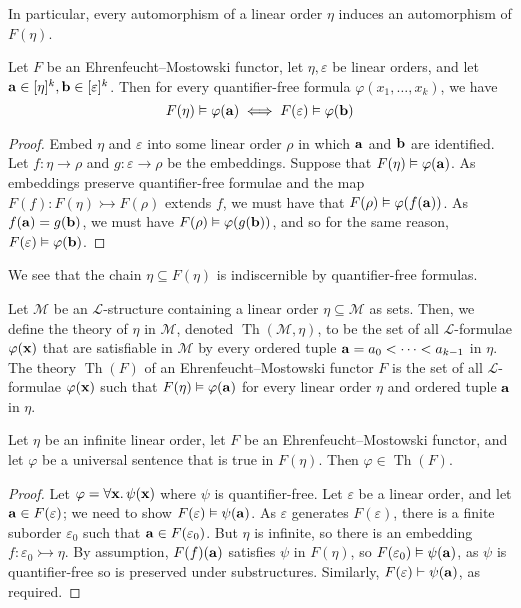In particular, every automorphism of a linear order \( \eta \) induces an automorphism of \( F(\eta) \).
\begin{proposition}
	Let \( F \) be an Ehrenfeucht--Mostowski functor, let \( \eta, \varepsilon \) be linear orders, and let \( \vb a \in [\eta]^k, \vb b \in [\varepsilon]^k \).
	Then for every quantifier-free formula \( \varphi(x_1, \dots, x_k) \), we have
	\[ F(\eta) \vDash \varphi(\vb a) \iff F(\varepsilon) \vDash \varphi(\vb b) \]
\end{proposition}
\begin{proof}
	Embed \( \eta \) and \( \varepsilon \) into some linear order \( \rho \) in which \( \vb a \) and \( \vb b \) are identified.
	Let \( f : \eta \to \rho \) and \( g : \varepsilon \to \rho \) be the embeddings.
	Suppose that \( F(\eta) \vDash \varphi(\vb a) \).
	As embeddings preserve quantifier-free formulae and the map \( F(f) : F(\eta) \rightarrowtail F(\rho) \) extends \( f \), we must have that \( F(\rho) \vDash \varphi(f(\vb a)) \).
	As \( f(\vb a) = g(\vb b) \), we must have \( F(\rho) \vDash \varphi(g(\vb b)) \), and so for the same reason, \( F(\varepsilon) \vDash \varphi(\vb b) \).
\end{proof}
We see that the chain \( \eta \subseteq F(\eta) \) is indiscernible by quantifier-free formulas.
\begin{definition}
	Let \( \mathcal M \) be an \( \mathcal L \)-structure containing a linear order \( \eta \subseteq \mathcal M \) as sets.
	Then, we define the theory of \( \eta \) in \( \mathcal M \), denoted \( \operatorname{Th}(\mathcal M, \eta) \), to be the set of all \( \mathcal L \)-formulae \( \varphi(\vb x) \) that are satisfiable in \( \mathcal M \) by every ordered tuple \( \vb a = a_0 < \dots < a_{k-1} \) in \( \eta \).
	The theory \( \operatorname{Th}(F) \) of an Ehrenfeucht--Mostowski functor \( F \) is the set of all \( \mathcal L \)-formulae \( \varphi(\vb x) \) such that \( F(\eta) \vDash \varphi(\vb a) \) for every linear order \( \eta \) and ordered tuple \( \vb a \) in \( \eta \).
\end{definition}
\begin{lemma}
	Let \( \eta \) be an infinite linear order, let \( F \) be an Ehrenfeucht--Mostowski functor, and let \( \varphi \) be a universal sentence that is true in \( F(\eta) \).
	Then \( \varphi \in \operatorname{Th}(F) \).
\end{lemma}
\begin{proof}
	Let \( \varphi = \forall \vb x.\, \psi(\vb x) \) where \( \psi \) is quantifier-free.
	Let \( \varepsilon \) be a linear order, and let \( \vb a \in F(\varepsilon) \); we need to show \( F(\varepsilon) \vDash \psi(\vb a) \).
	As \( \varepsilon \) generates \( F(\varepsilon) \), there is a finite suborder \( \varepsilon_0 \) such that \( \vb a \in F(\varepsilon_0) \).
	But \( \eta \) is infinite, so there is an embedding \( f : \varepsilon_0 \rightarrowtail \eta \).
	By assumption, \( F(f)(\vb a) \) satisfies \( \psi \) in \( F(\eta) \), so \( F(\varepsilon_0) \vDash \psi(\vb a) \), as \( \psi \) is quantifier-free so is preserved under substructures.
	Similarly, \( F(\varepsilon) \vdash \psi(\vb a) \), as required.
\end{proof}


